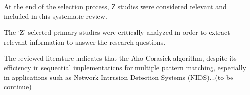 At the end of the selection process, Z studies were considered relevant and included in this systematic review.

The ‘Z’ selected primary studies were critically analyzed in order to extract relevant information to answer the research questions.

The reviewed literature indicates that the Aho-Corasick algorithm, despite its efficiency in sequential implementations for multiple pattern matching, especially in applications such as Network Intrusion Detection Systems (NIDS)...(to be continue)

